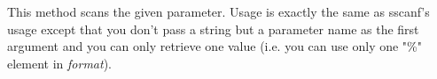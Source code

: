 \label{wxhtmltagscanparam}


This method scans the given parameter. Usage is exactly the same as sscanf's 
usage except that you don't pass a string but a parameter name as the first
argument
and you can only retrieve one value (i.e. you can use only one "\%" element
in {\it format}).






